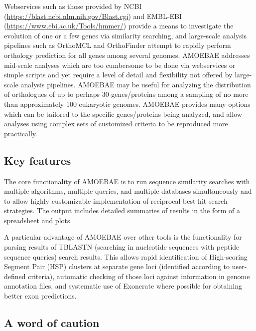 \documentclass[12pt,letterpaper]{article}
\begin{document}
\begin{linenumbers}
    Webservices such as those provided by NCBI
    (\url{https://blast.ncbi.nlm.nih.gov/Blast.cgi}) \citep{camacho2009} and
    EMBL-EBI (\url{https://www.ebi.ac.uk/Tools/hmmer/}) provide a means to
    investigate the evolution of one or a few genes via similarity searching,
    and large-scale analysis pipelines such as OrthoMCL \citep{li2003} and
    OrthoFinder \citep{emms2019} attempt to rapidly perform orthology
    prediction for all genes among several genomes. AMOEBAE addresses mid-scale
    analyses which are too cumbersome to be done via webservices or simple
    scripts and yet require a level of detail and flexibility not offered by
    large-scale analysis pipelines. AMOEBAE may be useful for analyzing the
    distribution of orthologues of up to perhaps 30 genes/proteins among a
    sampling of no more than approximately 100 eukaryotic genomes. AMOEBAE
    provides many options which can be tailored to the specific genes/proteins
    being analyzed, and allow analyses using complex sets of customized
    criteria to be reproduced more practically.


\subsection{Key features}

The core functionality of AMOEBAE is to run sequence similarity searches with multiple
    algorithms, multiple queries, and multiple databases simultaneously
    and to allow highly customizable implementation
    of reciprocal-best-hit search strategies. The output includes detailed
    summaries of results in the form of a spreadsheet and plots.
    
    A particular advantage of AMOEBAE over other tools is the functionality for
    parsing results of TBLASTN (searching in nucleotide sequences with peptide
    sequence queries) search results. This allows rapid identification of
    High-scoring Segment Pair (HSP) clusters at separate gene loci (identified
    according to user-defined criteria), automatic checking of those loci
    against information in genome annotation files, and systematic use of
    Exonerate \citep{slater2005} where possible for obtaining better exon
    predictions.  


\subsection{A word of caution}


\end{linenumbers}
\end{document}
